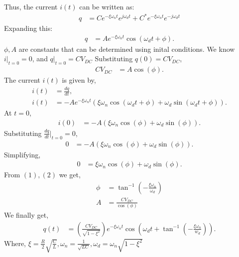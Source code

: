 \documentclass[a4paper,12pt]{article}
\begin{document}
Thus, the current $i(t)$ can be written as:
\begin{align*}
    q &= Ce^{-\xi \omega_n t} e^{j\omega_d t} + C^{*}e^{-\xi \omega_n t} e^{-j\omega_d t}
\end{align*}
Expanding this:
\begin{align*}
    q &=A e^{-\xi \omega_n t} \cos(\omega_d t + \phi) .
\end{align*}
$\phi, A$ are constants that can be determined using inital conditions. We know $i\Bigr|_{t=0} = 0$, and $q\Bigr|_{t=0} = CV_{DC}$\newline\newline
Substituting $q(0) = CV_{DC}$,
\begin{align*}
    CV_{DC} &= A \cos(\phi). \tag{1}
\end{align*}
The current $i(t)$ is given by,
\begin{align*}
    i(t) &= \frac{dq}{dt}, \\[5pt]
    i(t) &= -A e^{-\xi \omega_n t} (\xi \omega_n \cos(\omega_d t + \phi) + \omega_d \sin(\omega_d t + \phi)).
\end{align*}
At $t = 0$,
\begin{align*}
    i(0) &= -A (\xi \omega_n \cos(\phi) + \omega_d \sin(\phi)).
\end{align*}
Substituting $\frac{dq}{dt}\Bigr|_{t=0} = 0$,
\begin{align*}
    0 &= -A (\xi \omega_n \cos(\phi) + \omega_d \sin(\phi)).
\end{align*}
Simplifying,
\begin{align*}
    0 &= \xi \omega_n \cos(\phi) + \omega_d \sin(\phi). \tag{2}
\end{align*}
From $(1), (2)$ we get,
\begin{align*}
   \phi &= \tan^{-1}\left(-\frac{\xi \omega_n}{\omega_d}\right)\\
   A &= \frac{CV_{DC}}{\cos(\phi)}
\end{align*}
We finally get,
\begin{align*}
   q(t) &= \left(\frac{CV_{DC}}{\sqrt{1-\xi^2}} \right) e^{-\xi \omega_n t}\cos\left(\omega_d t + \tan^{-1}\left(-\frac{\xi \omega_n}{w_d}\right)\right). 
\end{align*}
Where, $\xi = \frac{R}{2}\sqrt{\frac{C}{L}}, \omega_n = \frac{1}{\sqrt{LC}}, \omega_d = \omega_n\sqrt{1-\xi^2}$
\end{document}
